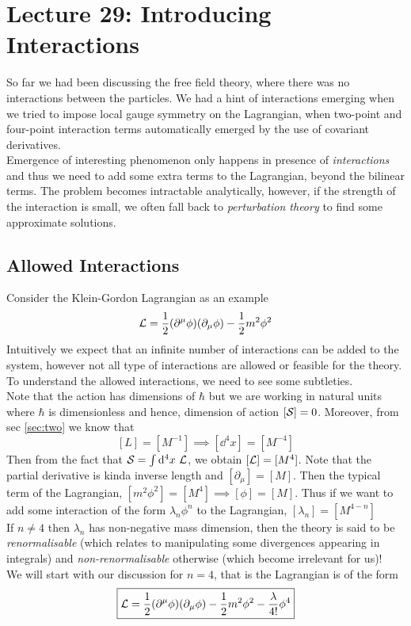 \section*{Lecture 29: Introducing Interactions}
So far we had been discussing the free field theory, where there was no interactions between the particles. We had a hint of interactions emerging when we tried to impose local gauge symmetry on the Lagrangian, when two-point and four-point interaction terms automatically emerged by the use of covariant derivatives. \\[0.2cm]
Emergence of interesting phenomenon only happens in presence of \textit{interactions}  and thus we need to add some extra terms to the Lagrangian, beyond the bilinear terms. The problem becomes intractable analytically, however,  if the strength of the interaction is small, we often fall back to \textit{perturbation theory} to find some approximate solutions.
\subsection{Allowed Interactions}
Consider the Klein-Gordon Lagrangian as an example 
$$\mathcal L = \frac{1}{2} (\partial^\mu \phi)(\partial_\mu \phi) - \frac{1}{2}m^2 \phi^2$$
Intuitively we expect that an infinite number of interactions can be added to the system, however not all type of interactions are allowed or feasible for the theory. To understand the allowed interactions, we need to see some subtleties. \\[0.2cm]
Note that the action has dimensions of $\hbar$ but we are working in natural units where $\hbar$ is dimensionless and hence, dimension of action $[\mathcal S]=0$. Moreover, from sec \ref{sec:two} we know that $$[L] = [M^{-1}]\implies [\dd^4x] = [M^{-4}]$$ Then from the fact that $\Ss = \int \dd^4 x\ \SL$, we obtain $[\mathcal L] = [M^4]$. Note that the partial derivative is kinda inverse length and $[\partial_\mu ] = [M]$. Then the typical term of the Lagrangian, $[m^2\phi^2]=[M^4]\implies [\phi]=[M]$. Thus if we want to add some interaction of the form $\lambda_n \phi^n$ to the Lagrangian, $[\lambda_n]=[M^{4-n}]$\\[0.2cm]
If $n \neq 4$ then $\lambda_n$ has non-negative mass dimension, then the theory is said to be \textit{renormalisable} (which relates to manipulating some divergences appearing in integrals) and \textit{non-renormalisable} otherwise (which become irrelevant for us)! \\[0.2cm]
We will start with our discussion for $n=4$, that is the Lagrangian is of the form 
$$\boxed{\mathcal L = \frac{1}{2} (\partial^\mu \phi)(\partial_\mu \phi) - \frac{1}{2}m^2 \phi^2 - \frac{\lambda}{4!}\phi^4}$$
